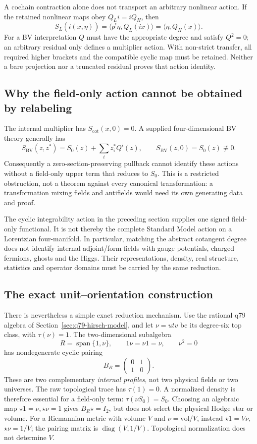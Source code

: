 \documentclass[11pt,a4paper]{article}
\begin{document}
A cochain contraction alone does not transport an arbitrary nonlinear
action. If the retained nonlinear maps obey \(Q_L i=iQ_H\), then
\[
 S_L(\widehat i(x,\eta))
 =\langle p^!\eta,Q_L(ix)\rangle
 =\langle\eta,Q_H(x)\rangle .
\]
For a BV interpretation \(Q\) must have the appropriate degree and satisfy
\(Q^2=0\); an arbitrary residual only defines a multiplier action. With
non-strict transfer, all required higher brackets and the compatible
cyclic map must be retained. Neither a bare projection nor a truncated
residual proves that action identity.

\subsection{Why the field-only action cannot be obtained by relabeling}
\label{sec:bv-zero-section}

The internal multiplier has \(S_{\mathrm{cot}}(x,0)=0\). A supplied
four-dimensional BV theory generally has
\[
 S_{\mathrm{BV}}(z,z^*)=S_0(z)+\sum_i z_i^*Q^i(z),
 \qquad S_{\mathrm{BV}}(z,0)=S_0(z)\not\equiv0.
\]
Consequently a zero-section-preserving pullback cannot identify these
actions without a field-only upper term that reduces to \(S_0\).
This is a restricted obstruction, not a theorem against every canonical
transformation: a transformation mixing fields and antifields would need
its own generating data and proof.

The cyclic integrability action in the preceding section supplies one
signed field-only functional. It is not thereby the complete Standard
Model action on a Lorentzian four-manifold. In particular, matching the
abstract cotangent degree does not identify internal adjoint/form fields
with gauge potentials, charged fermions, ghosts and the Higgs. Their
representations, density, real structure, statistics and operator domains
must be carried by the same reduction.

\subsection{The exact unit--orientation construction}
\label{sec:bv-orientation-profile}

There is nevertheless a simple exact reduction mechanism. Use the rational
q79 algebra of Section~\ref{sec:q79-hirsch-model}, and let
\(\nu=utv\) be its degree-six top class, with \(\tau(\nu)=1\).
The two-dimensional subalgebra
\[
 R=\operatorname{span}\{1,\nu\},\qquad
 1\nu=\nu1=\nu,\qquad \nu^2=0
\]
has nondegenerate cyclic pairing
\[
 B_R=\begin{pmatrix}0&1\\1&0\end{pmatrix}.
\]
These are two complementary \emph{internal profiles}, not two physical
fields or two universes. The raw topological trace has \(\tau(1)=0\).
A normalized density is therefore essential for a field-only term:
\(\tau(\nu S_0)=S_0\). Choosing an algebraic map
\(\star1=\nu,\star\nu=1\) gives \(B_R\star=I_2\), but does not select
the physical Hodge star or volume. For a Riemannian metric with volume
\(V\) and \(\nu=\mathrm{vol}/V\), instead
\(\star1=V\nu\), \(\star\nu=1/V\); the pairing matrix is
\(\operatorname{diag}(V,1/V)\). Topological normalization does not determine
\(V\).
\end{document}
